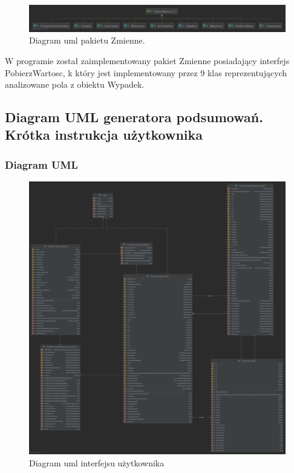 \documentclass{classrep}
\begin{document}
\begin{figure}[h!]
 \centering
 \includegraphics[width=14cm]{uml_2.png}
 \vspace{-0.3cm}
 \caption{Diagram uml pakietu Zmienne. }
 \label{uml_zmienne}
\end{figure}


W programie został zaimplementowany pakiet Zmienne posiadający interfejs PobierzWartosc, k który jest implementowany przez 9 klas reprezentujących analizowane pola z obiektu Wypadek. 

\newpage


\subsection{Diagram UML generatora podsumowań. Krótka instrukcja użytkownika} 

\subsubsection{Diagram UML}

\begin{figure}[h!]
 \centering
 \includegraphics[width=15cm]{uml_3.png}
 \vspace{-0.3cm}
 \caption{Diagram uml interfejsu użytkownika }
 \label{uml_gui}
\end{figure}
\end{document}
